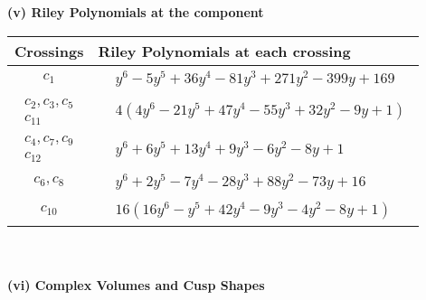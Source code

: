 \documentclass[1p]{elsarticle_modified}
\theoremstyle{definition}
\begin{document}
\flushleft \textbf{(v) Riley Polynomials at the component}\newline \\
\begin{tabular}{m{50pt}|m{274pt}}
Crossings & \hspace{64pt}Riley Polynomials at each crossing \\
\hline $$\begin{aligned}c_{1}\end{aligned}$$&$\begin{aligned}
&y^6-5 y^5+36 y^4-81 y^3+271 y^2-399 y+169
\end{aligned}$\\
\hline $$\begin{aligned}c_{2},c_{3},c_{5}\\c_{11}\end{aligned}$$&$\begin{aligned}
&4(4 y^6-21 y^5+47 y^4-55 y^3+32 y^2-9 y+1)
\end{aligned}$\\
\hline $$\begin{aligned}c_{4},c_{7},c_{9}\\c_{12}\end{aligned}$$&$\begin{aligned}
&y^6+6 y^5+13 y^4+9 y^3-6 y^2-8 y+1
\end{aligned}$\\
\hline $$\begin{aligned}c_{6},c_{8}\end{aligned}$$&$\begin{aligned}
&y^6+2 y^5-7 y^4-28 y^3+88 y^2-73 y+16
\end{aligned}$\\
\hline $$\begin{aligned}c_{10}\end{aligned}$$&$\begin{aligned}
&16(16 y^6- y^5+42 y^4-9 y^3-4 y^2-8 y+1)
\end{aligned}$\\
\hline
\end{tabular}\\~\\
\newpage\flushleft \textbf{(vi) Complex Volumes and Cusp Shapes}
\end{document}
